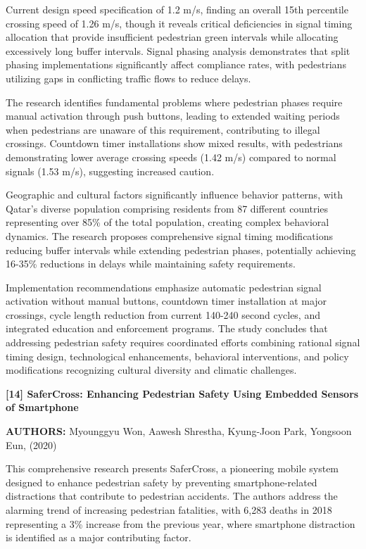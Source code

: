 \documentclass[a4paper, 12pt]{report}
\begin{document}
Current design speed specification of 1.2 m/s, finding an overall 15th percentile crossing speed of 1.26 m/s, though it reveals critical deficiencies in signal timing allocation that provide insufficient pedestrian green intervals while allocating excessively long buffer intervals. Signal phasing analysis demonstrates that split phasing implementations significantly affect compliance rates, with pedestrians utilizing gaps in conflicting traffic flows to reduce delays.

The research identifies fundamental problems where pedestrian phases require manual activation through push buttons, leading to extended waiting periods when pedestrians are unaware of this requirement, contributing to illegal crossings. Countdown timer installations show mixed results, with pedestrians demonstrating lower average crossing speeds (1.42 m/s) compared to normal signals (1.53 m/s), suggesting increased caution.

Geographic and cultural factors significantly influence behavior patterns, with Qatar's diverse population comprising residents from 87 different countries representing over 85\% of the total population, creating complex behavioral dynamics. The research proposes comprehensive signal timing modifications reducing buffer intervals while extending pedestrian phases, potentially achieving 16-35\% reductions in delays while maintaining safety requirements.

Implementation recommendations emphasize automatic pedestrian signal activation without manual buttons, countdown timer installation at major crossings, cycle length reduction from current 140-240 second cycles, and integrated education and enforcement programs. The study concludes that addressing pedestrian safety requires coordinated efforts combining rational signal timing design, technological enhancements, behavioral interventions, and policy modifications recognizing cultural diversity and climatic challenges.

\noindent \textbf{[14] SaferCross: Enhancing Pedestrian Safety Using Embedded Sensors of Smartphone}

\textbf{AUTHORS:} Myounggyu Won, Aawesh Shrestha, Kyung-Joon Park, Yongsoon Eun, (2020)


This comprehensive research presents SaferCross, a pioneering mobile system designed to enhance pedestrian safety by preventing smartphone-related distractions that contribute to pedestrian accidents. The authors address the alarming trend of increasing pedestrian fatalities, with 6,283 deaths in 2018 representing a 3\% increase from the previous year, where smartphone distraction is identified as a major contributing factor.
\end{document}
